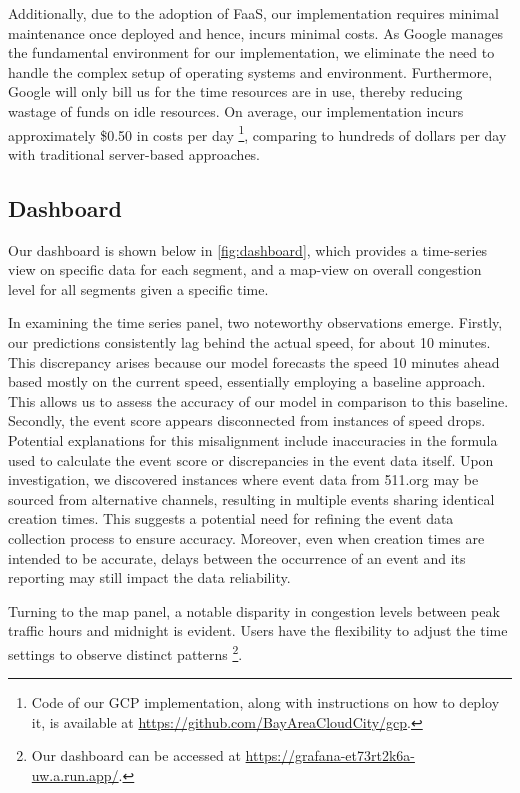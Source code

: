 Additionally, due to the adoption of FaaS, our implementation requires minimal maintenance once deployed and hence, incurs minimal costs. As Google manages the fundamental environment for our implementation, we eliminate the need to handle the complex setup of operating systems and environment. Furthermore, Google will only bill us for the time resources are in use, thereby reducing wastage of funds on idle resources. On average, our implementation incurs approximately \$0.50 in costs per day \footnote{Code of our GCP implementation, along with instructions on how to deploy it, is available at \url{https://github.com/BayAreaCloudCity/gcp}.}, comparing to hundreds of dollars per day with traditional server-based approaches.

\subsection{Dashboard}
Our dashboard is shown below in  \autoref{fig:dashboard}, which provides a time-series view on specific data for each segment, and a map-view on overall congestion level for all segments given a specific time.

In examining the time series panel, two noteworthy observations emerge. Firstly, our predictions consistently lag behind the actual speed, for about 10 minutes. This discrepancy arises because our model forecasts the speed 10 minutes ahead based mostly on the current speed, essentially employing a baseline approach. This allows us to assess the accuracy of our model in comparison to this baseline. Secondly, the event score appears disconnected from instances of speed drops. Potential explanations for this misalignment include inaccuracies in the formula used to calculate the event score or discrepancies in the event data itself. Upon investigation, we discovered instances where event data from 511.org may be sourced from alternative channels, resulting in multiple events sharing identical creation times. This suggests a potential need for refining the event data collection process to ensure accuracy. Moreover, even when creation times are intended to be accurate, delays between the occurrence of an event and its reporting may still impact the data reliability.

Turning to the map panel, a notable disparity in congestion levels between peak traffic hours and midnight is evident. Users have the flexibility to adjust the time settings to observe distinct patterns \footnote{Our dashboard can be accessed at \url{https://grafana-et73rt2k6a-uw.a.run.app/}.}. 

